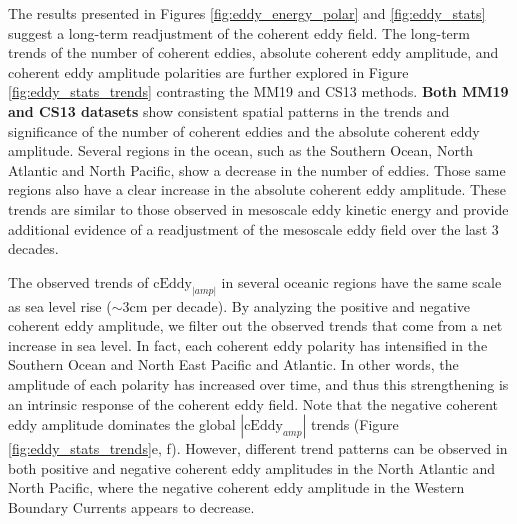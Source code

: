 \documentclass[draft,linenumbers]{agujournal2019}
\newcommand{\cEddy}{\textrm{cEddy}}
\begin{document}
	The results presented in Figures \ref{fig:eddy_energy_polar} and \ref{fig:eddy_stats} suggest a long-term readjustment of the coherent eddy field. 
	The long-term trends of the number of coherent eddies, absolute coherent eddy amplitude, and coherent eddy amplitude polarities are further explored in Figure \ref{fig:eddy_stats_trends} contrasting the MM19 and CS13 methods. 
	\textbf{Both MM19 and CS13 datasets} show consistent spatial patterns in the trends and significance of the number of coherent eddies and the absolute coherent eddy amplitude. 
	Several regions in the ocean, such as the Southern Ocean, North Atlantic and North Pacific, show a decrease in the number of eddies. Those same regions also have a clear increase in the absolute coherent eddy amplitude. 
	These trends are similar to those observed in mesoscale eddy kinetic energy \citep{Martinez_Kinetic_2021} and provide additional evidence of a readjustment of the mesoscale eddy field over the last 3 decades. 

	The observed trends of $\cEddy_{|amp|}$ in several oceanic regions have the same scale as sea level rise ($\sim$3cm per decade). By analyzing the positive and negative coherent eddy amplitude, we filter out the observed trends that come from a net increase in sea level. 
	In fact, each coherent eddy polarity has intensified in the Southern Ocean and North East Pacific and Atlantic. 
	In other words, the amplitude of each polarity has increased over time, and thus this strengthening is an intrinsic response of the coherent eddy field. Note that the negative coherent eddy amplitude dominates the global $|\cEddy_{amp}|$ trends (Figure \ref{fig:eddy_stats_trends}e, f). However, different trend patterns can be observed in both positive and negative coherent eddy amplitudes in the North Atlantic and North Pacific, where the negative coherent eddy amplitude in the  Western Boundary Currents appears to decrease.
\end{document}
